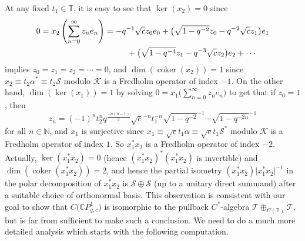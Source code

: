 At any fixed $t_{1}\in\mathbb{T}$, it is easy to see that $\ker (x_{2}) =0$ since
\begin{gather*}
0=x_{2}\left( \sum_{n=0}^{\infty}z_{n}e_{n}\right) =-q^{-1}\sqrt{c}
z_{0}e_{0}+\big( \sqrt{1-q^{-2}}z_{0}-q^{-2}\sqrt{c}z_{1}\big)
e_{1}\\
\hphantom{0=x_{2}\left( \sum_{n=0}^{\infty}z_{n}e_{n}\right) =}{} +\big( \sqrt{1-q^{-4}}z_{1}-q^{-3}\sqrt{c}z_{2}\big) e_{2}+\cdots
\end{gather*}
implies $z_{0}=z_{1}=z_{2}=\cdots=0$, and $\dim( \operatorname{coker}(
x_{2}) ) =1$ since $x_{2}\equiv t_{2}\alpha^{\ast}\equiv
t_{2}\mathcal{S}$ modulo $\mathcal{K}$ is a Fredholm operator of index $-1$.
On the other hand, $\dim( \ker( x_{1}) ) =1$ by
solving $0=x_{1}\Big( \sum\limits_{n=0}^{\infty}z_{n}e_{n}\Big) $ to get that if
$z_{0}=1$, then
\[
z_{n}=( -1) ^{n}t_{2}^{n}q^{\frac{-n ( n-1 ) }{2}%
}\sqrt{c}^{-n}t_{1}^{-n}\sqrt{1-q^{-2}}^{-1}\cdots\sqrt{1-q^{-2n}}^{-1}%
\]
for all $n\in\mathbb{N}$, and $x_{1}$ is surjective since $x_{1}\equiv\sqrt
{c}t_{1}\alpha\equiv\sqrt{c}t_{1}\mathcal{S}^{\ast}$ modulo $\mathcal{K}$ is a
Fredholm operator of index $1$. So $x_{1}^{\ast}x_{2}$ is a Fredholm operator
of index $-2$. Actually, $\ker ( x_{1}^{\ast}x_{2} ) =0$ (hence
$ ( x_{1}^{\ast}x_{2} ) ^{\ast} ( x_{1}^{\ast}x_{2}) $
is invertible) and $\dim ( \operatorname{coker} ( x_{1}^{\ast}%
x_{2} ) ) =2$, and hence the partial isometry $(
x_{1}^{\ast}x_{2}) \vert x_{1}^{\ast}x_{2}\vert ^{-1}$ in
the polar decomposition of $x_{1}^{\ast}x_{2}$ is $\mathcal{S}\oplus
\mathcal{S}$ (up to a unitary direct summand) after a suitable choice of
orthonormal basis. This observation is consistent with our goal to show that
$C\big( \mathbb{C}P_{q,c}^{1}\big) $ is isomorphic to the pullback
$C^*$-algebra $\mathcal{T}\oplus_{C ( \mathbb{T} ) }\mathcal{T}$, but
is far from sufficient to make such a conclusion. We need to do a much more
detailed analysis which starts with the following computation.

